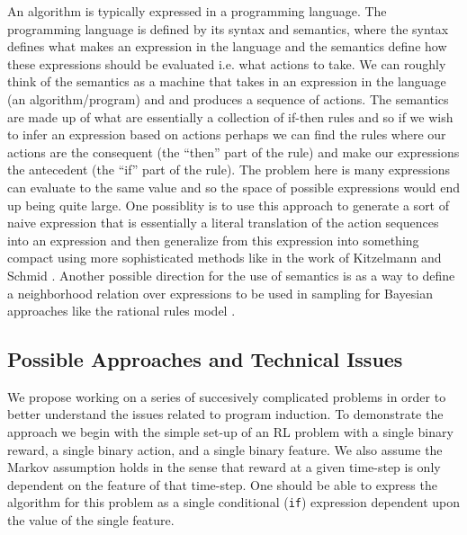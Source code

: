 \documentclass[a4paper,12pt]{article}
\begin{document}
An algorithm is typically expressed in a programming language.  The programming language is defined by its syntax and semantics, where the syntax defines what makes an expression in the language and the semantics define how these expressions should be evaluated i.e. what actions to take.  We can roughly think of the semantics as a machine that takes in an expression in the language (an algorithm/program) and and produces a sequence of actions.  The semantics are made up of what are essentially a collection of if-then rules and so if we wish to infer an expression based on actions perhaps we can find the rules where our actions are the consequent (the ``then'' part of the rule) and make our expressions the antecedent (the ``if'' part of the rule).  The problem here is many expressions can evaluate to the same value and so the space of possible expressions would end up being quite large.  One possiblity is to use this approach to generate a sort of naive expression that is essentially a literal translation of the action sequences into an expression and then generalize from this expression into something compact using more sophisticated methods like in the work of Kitzelmann and Schmid \cite{Kitzelmann2006Inductive}.  Another possible direction for the use of semantics is as a way to define a neighborhood relation over expressions to be used in sampling for Bayesian approaches like the rational rules model \cite{Goodman2008Rational}.  

\subsection{Possible Approaches and Technical Issues}
We propose working on a series of succesively complicated problems in order to better understand the issues related to program induction.  To demonstrate the approach we begin with the simple set-up of an RL problem with a single binary reward, a single binary action, and a single binary feature.  We also assume the Markov assumption holds in the sense that reward at a given time-step is only dependent on the feature of that time-step.  One should be able to express the algorithm for this problem as a single conditional (\texttt{if}) expression dependent upon the value of the single feature.
\end{document}
